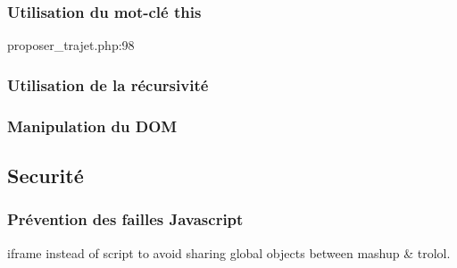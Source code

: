 \documentclass[a4paper]{article}
\begin{document}
\subsubsection{Utilisation du mot-clé this}
proposer_trajet.php:98
\subsubsection{Utilisation de la récursivité}
\subsubsection{Manipulation du DOM}

\subsection{Securité} 
\subsubsection{Prévention des failles Javascript}
iframe instead of script to avoid sharing global objects
between mashup & trolol.
\end{document}
